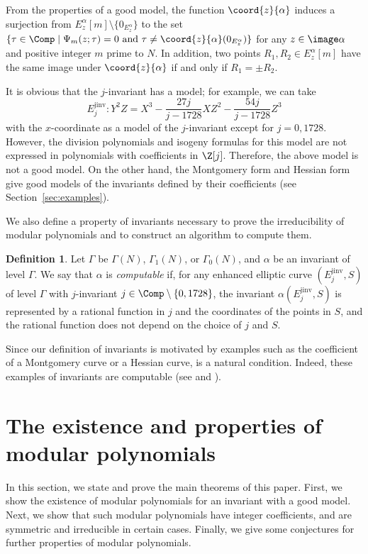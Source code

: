 \documentclass{amsart}
\theoremstyle{definition}
\newtheorem{definition}[theorem]{Definition}
\theoremstyle{remark}
\numberwithin{equation}{section}
\begin{document}
From the properties of a good model,
the function $\coord{z}{\alpha}$ induces a surjection from $E_z^\alpha[m]\setminus\{0_{E_z^\alpha}\}$ to
the set $\{\tau \in \Comp \mid \Psi_m(z; \tau) = 0 \text{ and } \tau \neq \coord{z}{\alpha}(0_{E_z^\alpha})\}$
for any $z \in \image \alpha$ and positive integer $m$ prime to $N$.
In addition, two points $R_1, R_2 \in E_z^\alpha[m]$ have the same image under $\coord{z}{\alpha}$
if and only if $R_1 = \pm R_2$.

It is obvious that the $j$-invariant has a model; for example,
we can take
\begin{equation*}
    E_j^\mathrm{jinv} : Y^2Z = X^3 - \frac{27j}{j - 1728} XZ^2 - \frac{54j}{j - 1728} Z^3
\end{equation*}
with the $x$-coordinate as a model of the $j$-invariant
except for $j = 0, 1728$.
However, the division polynomials and isogeny formulas
for this model are not expressed in polynomials with coefficients in $\Z[j]$.
Therefore, the above model is not a good model.
On the other hand,
the Montgomery form and Hessian form
give good models of the invariants defined by their coefficients
(see Section~\ref{sec:examples}).

We also define a property of invariants
necessary to prove the irreducibility of modular polynomials
and to construct an algorithm to compute them.
\begin{definition}\label{def:computable}
    Let $\Gamma$ be $\Gamma(N)$, $\Gamma_1(N)$, or $\Gamma_0(N)$,
    and $\alpha$ be an invariant of level $\Gamma$.
    We say that $\alpha$ is \emph{computable} if,
    for any enhanced elliptic curve $(E^\mathrm{jinv}_j, S)$ of level $\Gamma$
    with $j$-invariant $j \in \Comp\setminus\{0, 1728\}$,
    the invariant $\alpha(E^\mathrm{jinv}_j, S)$ is represented by
    a rational function in $j$
    and the coordinates of the points in $S$,
    and the rational function does not depend on the choice of $j$ and $S$.
\end{definition}
Since our definition of invariants is motivated by examples such as
the coefficient of a Montgomery curve or a Hessian curve,
 is a natural condition.
Indeed, these examples of invariants are computable
(see  and ).


\section{The existence and properties of modular polynomials}\label{sec:main_theorems}
In this section, we state and prove the main theorems of this paper.
First, we show the existence of modular polynomials
for an invariant with a good model.
Next, we show that such modular polynomials have integer coefficients,
and are symmetric and irreducible in certain cases.
Finally, we give some conjectures for further properties of modular polynomials.
\end{document}
